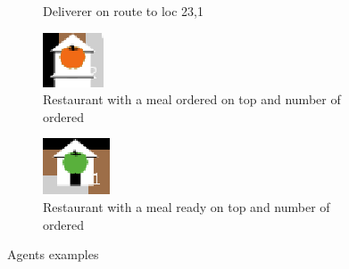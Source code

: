 \begin{figure}
\begin{subfigure}[m]{0.1\textwidth}
         \caption{Deliverer on route to loc 23,1}
     \end{subfigure}
     \hfill
     \begin{subfigure}[m]{0.1\textwidth}
         \centering
         \includegraphics[width=\textwidth]{sections/pics/meal_prep}
         \caption{Restaurant with a meal ordered on top and number of ordered}
     \end{subfigure}
      \hfill
     \begin{subfigure}[m]{0.1\textwidth}
         \centering
         \includegraphics[width=\textwidth]{sections/pics/meal_ready}
         \caption{Restaurant with a meal ready on top and number of ordered}
     \end{subfigure}
        \caption{Agents examples}
        \label{fig:agents}
\end{figure}

